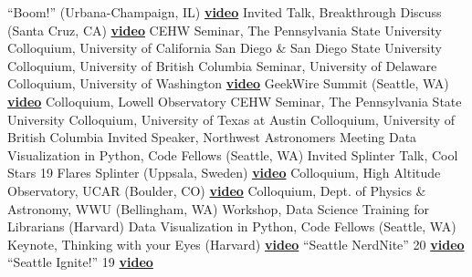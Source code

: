 \documentclass{article}
\begin{document}
\begin{llist}
``Boom!'' (Urbana-Champaign, IL) \href{https://www.youtube.com/watch?v=tbq0EVyrPT4}{\color{NavyBlue}\bf{video}} %
Invited Talk, Breakthrough Discuss (Santa Cruz, CA) \href{https://www.youtube.com/watch?v=oqFae-n8lJI}{\color{NavyBlue}\bf{video}} 
CEHW Seminar, The Pennsylvania State University  %
Colloquium, University of California San Diego \& San Diego State University 
Colloquium, University of British Columbia 
Seminar, University of Delaware 
Colloquium, University of Washington \href{https://www.youtube.com/watch?v=X6r9fvRcgo4}{\color{NavyBlue}\bf{video}} 
GeekWire Summit (Seattle, WA) \href{https://www.youtube.com/watch?v=mG9h1gHb4N4}{\color{NavyBlue}\bf{video}} 
Colloquium, Lowell Observatory 
CEHW Seminar, The Pennsylvania State University 
Colloquium, University of Texas at Austin 
Colloquium, University of British Columbia 
Invited Speaker, Northwest Astronomers Meeting 
Data Visualization in Python, Code Fellows (Seattle, WA) 
Invited Splinter Talk, Cool Stars 19 Flares Splinter (Uppsala, Sweden) \href{https://www.youtube.com/watch?v=3SDwC7tTCSQ}{\color{NavyBlue}\bf{video}} 
Colloquium, High Altitude Observatory, UCAR (Boulder, CO) \href{https://www.youtube.com/watch?v=Gf7jsYA6oJ8}{\color{NavyBlue}\bf{video}}
Colloquium, Dept. of Physics \& Astronomy, WWU (Bellingham, WA)
Workshop, Data Science Training for Librarians (Harvard) 
Data Visualization in Python, Code Fellows (Seattle, WA) 
Keynote, Thinking with your Eyes (Harvard) \href{https://www.youtube.com/watch?v=kmSr60TmNFg}{\color{NavyBlue}\bf{video}}  
``Seattle NerdNite'' 20 \href{https://vimeo.com/78773806}{\color{NavyBlue}\bf{video}}
``Seattle Ignite!'' 19 \href{http://www.youtube.com/watch?v=vINb5GCtDR8}{\color{NavyBlue} \bf{video}}







\end{llist}
\end{document}
